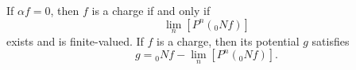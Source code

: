 If $\alpha f = 0$, then $f$ is a charge if and only if
$$\lim_{n} [P^n ({}_0 N f)]$$
exists and is finite-valued. If $f$ is a charge, then its potential $g$ satisfies
$$g = {}_0 N f - \lim_{n} [P^n ({}_0 N f)].$$
